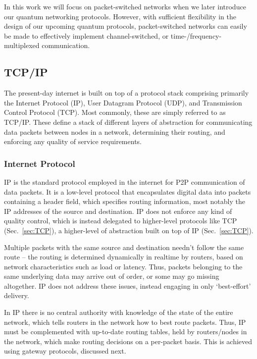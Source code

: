 In this work we will focus on packet-switched networks when we later introduce our quantum networking protocols. However, with sufficient flexibility in the design of our upcoming quantum protocols, packet-switched networks can easily be made to effectively implement channel-switched, or time-/frequency-multiplexed communication.

%
%

\subsection{TCP/IP} 

The present-day internet is built on top of a protocol stack comprising primarily the Internet Protocol (IP), User Datagram Protocol (UDP), and Transmission Control Protocol (TCP). Most commonly, these are simply referred to as TCP/IP. These define a stack of different layers of abstraction for communicating data packets between nodes in a network, determining their routing, and enforcing any quality of service requirements.

%
%

\subsubsection{Internet Protocol} 

IP is the standard protocol employed in the internet for P2P communication of data packets. It is a low-level protocol that encapsulates digital data into packets containing a header field, which specifies routing information, most notably the IP addresses of the source and destination. IP does not enforce any kind of quality control, which is instead delegated to higher-level protocols like TCP (Sec.~\ref{sec:TCP}), a higher-level of abstraction built on top of IP (Sec.~\ref{sec:TCP}).

Multiple packets with the same source and destination needn't follow the same route -- the routing is determined dynamically in realtime by routers, based on network characteristics such as load or latency. Thus, packets belonging to the same underlying data may arrive out of order, or some may go missing altogether. IP does not address these issues, instead engaging in only `best-effort' delivery. 

In IP there is no central authority with knowledge of the state of the entire network, which tells routers in the network how to best route packets. Thus, IP must be complemented with up-to-date routing tables, held by routers/nodes in the network, which make routing decisions on a per-packet basis. This is achieved using gateway protocols, discussed next.

